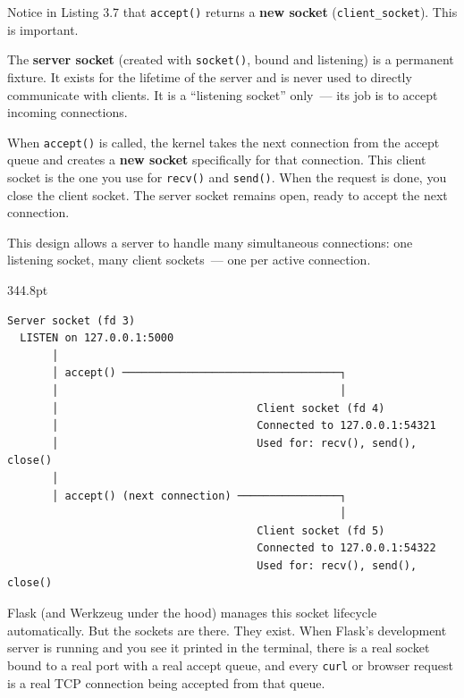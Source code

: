 Notice in Listing 3.7 that \texttt{accept()} returns a \textbf{new socket} (\texttt{client\_socket}). This is important.

The \textbf{server socket} (created with \texttt{socket()}, bound and listening) is a permanent fixture. It exists for the lifetime of the server and is never used to directly communicate with clients. It is a ``listening socket'' only~--- its job is to accept incoming connections.

When \texttt{accept()} is called, the kernel takes the next connection from the accept queue and creates a \textbf{new socket} specifically for that connection. This client socket is the one you use for \texttt{recv()} and \texttt{send()}. When the request is done, you close the client socket. The server socket remains open, ready to accept the next connection.

This design allows a server to handle many simultaneous connections: one listening socket, many client sockets~--- one per active connection.

\begin{diagrambox}[short]{344.8pt}
\begin{Verbatim}[fontsize=\fontsize{9.0}{8.55}\selectfont]
Server socket (fd 3)
  LISTEN on 127.0.0.1:5000
       │
       │ accept() ──────────────────────────────────┐
       │                                            │
       │                               Client socket (fd 4)
       │                               Connected to 127.0.0.1:54321
       │                               Used for: recv(), send(), close()
       │
       │ accept() (next connection) ────────────────┐
                                                    │
                                       Client socket (fd 5)
                                       Connected to 127.0.0.1:54322
                                       Used for: recv(), send(), close()
\end{Verbatim}
\end{diagrambox}

\noindent{}Flask (and Werkzeug under the hood) manages this socket lifecycle automatically. But the sockets are there. They exist. When Flask's development server is running and you see it printed in the terminal, there is a real socket bound to a real port with a real accept queue, and every \texttt{curl} or browser request is a real TCP connection being accepted from that queue.

\label{03-network-capability:the-socket-lifecycle-full-state-diagram}

